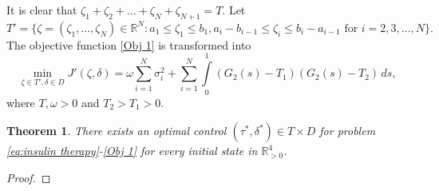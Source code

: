 \documentclass[a4paper,fleqn]{cas-sc}
\numberwithin{equation}{section}
\numberwithin{equation}{section}
\newcommand{\1}{\boldsymbol{1}}
\newcommand{\0}{\boldsymbol{0}}
\newtheorem{theorem}{Theorem}[section]
\begin{document}
It is clear that $\zeta_1+\zeta_2+\ldots+\zeta_N+\zeta_{N+1} = T$. Let 
\[
T' = \{\zeta = (\zeta_1,\ldots,\zeta_N) \in \mathbb{R}^{N}: a_1 \le \zeta_1 \le b_1, a_{i}-b_{i-1} \le \zeta_i \le b_{i}-a_{i-1} \text{ for } i = 2,3,\ldots,N \}.
\]
The objective function \eqref{Obj 1} is transformed into
\begin{equation}\label{Obj 1 transform}
    \underset{\zeta \in T', \delta \in D}{\min} J'(\zeta, \delta) = \omega\displaystyle\sum_{i=1}^{N} \sigma_i^2 + \displaystyle\sum_{i=1}^N \int\limits_0^1 (G_2(s) - T_1)(G_2(s)-T_2)\, ds,
\end{equation}
where $T, \omega > 0$ and $T_2 > T_1 > 0$.

\begin{theorem}
    There exists an optimal control $(\tau^*,\delta^*) \in T\times D$ for problem \eqref{eq:insulin therapy}-\eqref{Obj 1} for every initial state in $\mathbb{R}^4_{> 0}$.
\end{theorem}

\begin{proof}
    
\end{proof}
\end{document}
